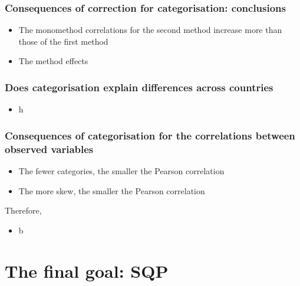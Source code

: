 \documentclass{beamer}
\begin{document}
\begin{frame}
\frametitle{Consequences of correction for categorisation: conclusions}

	\begin{itemize}
		\item The monomethod correlations for the second method increase more than those of the first method
		\item The method effects 
	\end{itemize}
 
\end{frame}



\begin{frame}
\frametitle{Does categorisation explain differences across countries}

	\begin{itemize}
		\item h
	\end{itemize}
 
\end{frame}


\begin{frame}
\frametitle{Consequences of categorisation for the correlations between observed variables}

	\begin{itemize}[<alert@+>]
		\item The fewer categories, the smaller the Pearson correlation
		\item The more skew, the smaller the Pearson correlation
	\end{itemize}
 
	Therefore,
	\begin{itemize}[<alert@+>]
		\item b
	\end{itemize}

\end{frame}


\section{The final goal: SQP}
\end{document}
